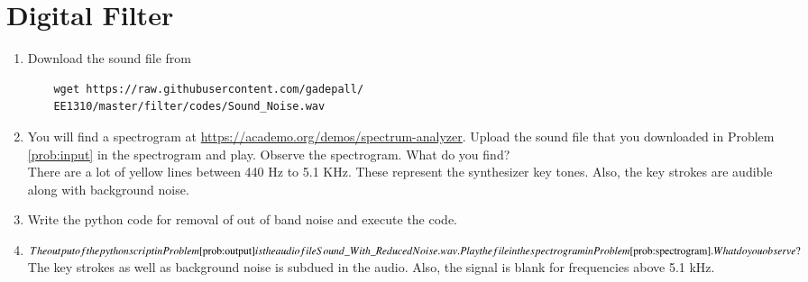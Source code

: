 \documentclass[journal,12pt,twocolumn]{IEEEtran}
\renewcommand\thesection{\arabic{section}}
\begin{document}
\section{Digital Filter}
\begin{enumerate}[label=\thesection.\arabic*
,ref=\thesection.\theenumi]
\item
\label{prob:input}
Download the sound file from  
\begin{lstlisting}
	wget https://raw.githubusercontent.com/gadepall/ 
	EE1310/master/filter/codes/Sound_Noise.wav
\end{lstlisting}
\item
\label{prob:spectrogram}
You will find a spectrogram at \href{https://academo.org/demos/spectrum-analyzer}{\url{https://academo.org/demos/spectrum-analyzer}}. 
%
Upload the sound file that you downloaded in Problem \ref{prob:input} in the spectrogram  and play.  Observe the spectrogram. What do you find?
\\
%
\solution There are a lot of yellow lines between 440 Hz to 5.1 KHz.  These represent the synthesizer key tones. Also, the key strokes
are audible along with background noise.
\item
\label{prob:output}
Write the python code for removal of out of band noise and execute the code.
\\
\solution
%
%
\item
  $The output of the python script in Problem \ref{prob:output} is the audio file Sound\_With\_ReducedNoise.wav. Play the file in the spectrogram in Problem \ref{prob:spectrogram}. What do you observe?$
\\
\solution The key strokes as well as background noise is subdued in the audio.  Also,  the signal is blank for frequencies above 5.1 kHz.

\end{enumerate}
\end{document}
